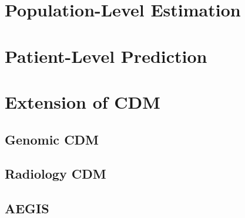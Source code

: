 \documentclass[]{book}
\begin{document}
\hypertarget{population-level-estimation}{%
\chapter{Population-Level Estimation}\label{population-level-estimation}}

\hypertarget{patient-level-prediction}{%
\chapter{Patient-Level Prediction}\label{patient-level-prediction}}

\hypertarget{extension-of-cdm}{%
\chapter{Extension of CDM}\label{extension-of-cdm}}

\hypertarget{genomic-cdm}{%
\section{Genomic CDM}\label{genomic-cdm}}

\hypertarget{radiology-cdm}{%
\section{Radiology CDM}\label{radiology-cdm}}

\hypertarget{aegis}{%
\section{AEGIS}\label{aegis}}


\end{document}
